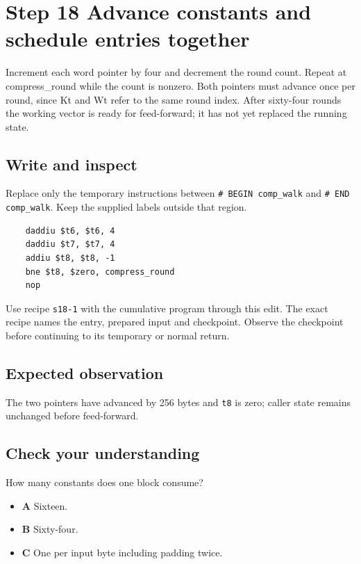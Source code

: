 \section{Step 18 Advance constants and schedule entries together}\label{sha-s18}

Increment each word pointer by four and decrement the round count. Repeat at compress\_round while the count is nonzero. Both pointers must advance once per round, since Kt and Wt refer to the same round index. After sixty-four rounds the working vector is ready for feed-forward; it has not yet replaced the running state.

\subsection{Write and inspect}
Replace only the temporary instructions between \texttt{\# BEGIN comp\_walk} and \texttt{\# END comp\_walk}. Keep the supplied labels outside that region.

\begin{verbatim}
    daddiu $t6, $t6, 4
    daddiu $t7, $t7, 4
    addiu $t8, $t8, -1
    bne $t8, $zero, compress_round
    nop
\end{verbatim}

Use recipe \texttt{s18-1} with the cumulative program through this edit. The exact recipe names the entry, prepared input and checkpoint. Observe the checkpoint before continuing to its temporary or normal return.

\subsection{Expected observation}
The two pointers have advanced by 256 bytes and \texttt{t8} is zero; caller state remains unchanged before feed-forward.

\subsection{Check your understanding}
How many constants does one block consume?

\begin{itemize}
  \item \textbf{A} Sixteen.
  \item \textbf{B} Sixty-four.
  \item \textbf{C} One per input byte including padding twice.
\end{itemize}
